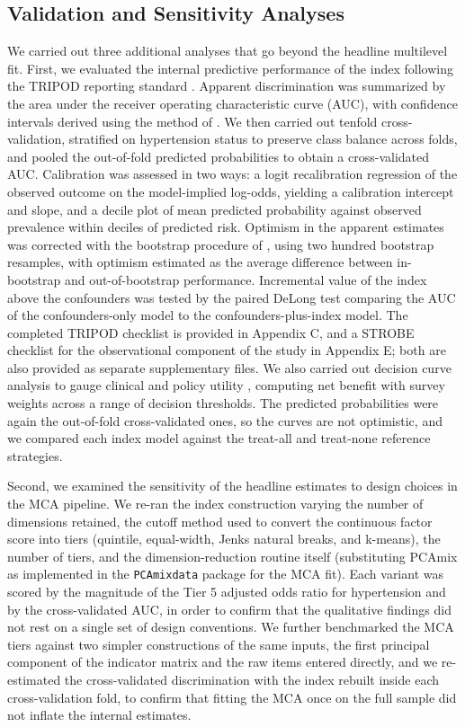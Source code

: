 \documentclass[
  12pt,
  a4paper]{article}
\newcounter{none} %
\begin{document}
\subsection{Validation and Sensitivity Analyses}\label{validation-and-sensitivity-analyses}

We carried out three additional analyses that go beyond the headline multilevel fit. First, we evaluated the internal predictive performance of the index following the TRIPOD reporting standard \citep{moons_tripod_2015}. Apparent discrimination was summarized by the area under the receiver operating characteristic curve (AUC), with confidence intervals derived using the method of \citet{delong_areas_1988}. We then carried out tenfold cross-validation, stratified on hypertension status to preserve class balance across folds, and pooled the out-of-fold predicted probabilities to obtain a cross-validated AUC. Calibration was assessed in two ways: a logit recalibration regression of the observed outcome on the model-implied log-odds, yielding a calibration intercept and slope, and a decile plot of mean predicted probability against observed prevalence within deciles of predicted risk. Optimism in the apparent estimates was corrected with the bootstrap procedure of \citet{harrell_regression_2015}, using two hundred bootstrap resamples, with optimism estimated as the average difference between in-bootstrap and out-of-bootstrap performance. Incremental value of the index above the confounders was tested by the paired DeLong test comparing the AUC of the confounders-only model to the confounders-plus-index model. The completed TRIPOD checklist is provided in Appendix C, and a STROBE checklist for the observational component of the study in Appendix E; both are also provided as separate supplementary files. We also carried out decision curve analysis to gauge clinical and policy utility \citep{vickers_decision_2006}, computing net benefit with survey weights across a range of decision thresholds. The predicted probabilities were again the out-of-fold cross-validated ones, so the curves are not optimistic, and we compared each index model against the treat-all and treat-none reference strategies.

Second, we examined the sensitivity of the headline estimates to design choices in the MCA pipeline. We re-ran the index construction varying the number of dimensions retained, the cutoff method used to convert the continuous factor score into tiers (quintile, equal-width, Jenks natural breaks, and k-means), the number of tiers, and the dimension-reduction routine itself (substituting PCAmix as implemented in the \texttt{PCAmixdata} package for the MCA fit). Each variant was scored by the magnitude of the Tier 5 adjusted odds ratio for hypertension and by the cross-validated AUC, in order to confirm that the qualitative findings did not rest on a single set of design conventions. We further benchmarked the MCA tiers against two simpler constructions of the same inputs, the first principal component of the indicator matrix and the raw items entered directly, and we re-estimated the cross-validated discrimination with the index rebuilt inside each cross-validation fold, to confirm that fitting the MCA once on the full sample did not inflate the internal estimates.
\end{document}
